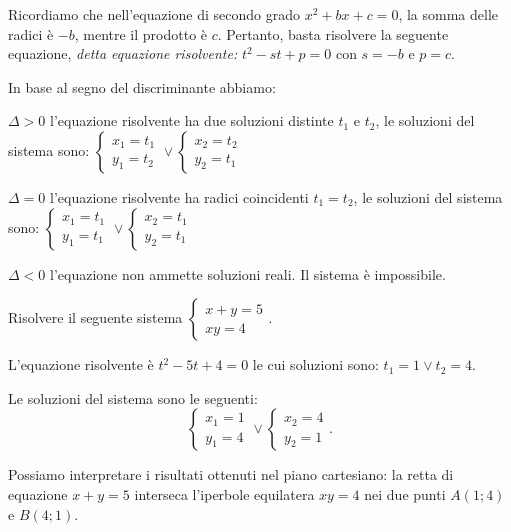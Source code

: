 Ricordiamo che nell'equazione di secondo grado \(x^2+bx+c=0\), la somma delle 
radici è \(-b\), mentre il prodotto è \(c\). Pertanto, basta risolvere la 
seguente 
equazione, \emph{detta equazione risolvente: } \(t^2-st+p=0\) con \(s=-b\) e 
\(p=c\).

In base al segno del discriminante abbiamo:
\begin{itemize*}
\item \(\Delta >0\) l'equazione risolvente ha due soluzioni distinte \( t_1 \) 
e 
\( 
t_2 \), le soluzioni del sistema sono: 
\(\left\{\begin{array}{l}{x_1=t_1}\\{y_1=t_2}\end{array}\right.\vee 
\left\{\begin{array}{l}{x_2=t_2}\\{y_2=t_1}\end{array}\right.\)
\item \(\Delta =0\) l'equazione risolvente ha radici coincidenti \(t_1=t_2\), 
le 
soluzioni del sistema sono: 
\(\left\{\begin{array}{l}{x_1=t_1}\\{y_1=t_1}\end{array}\right.\vee 
\left\{\begin{array}{l}{x_2=t_1}\\{y_2=t_1}\end{array}\right.\)
\item \(\Delta <0\) l'equazione non ammette soluzioni reali. Il sistema è 
impossibile.
\end{itemize*}

\begin{esempio}
Risolvere il seguente sistema 
\(\left\{\begin{array}{l}{x+y=5}\\{xy=4}\end{array}\right.\).
\begin{multicols}{2}
L'equazione risolvente è \(t^2-5t+4=0\) le cui soluzioni sono: \(t_1=1\vee 
t_2=4\).

Le soluzioni del sistema sono le seguenti: \[ 
\left\{\begin{array}{l}{x_1=1}\\{y_1=4}\end{array}\right.\vee 
\left\{\begin{array}{l}{x_2=4}\\{y_2=1}\end{array}\right.. \]

Possiamo interpretare i risultati ottenuti nel piano cartesiano: la retta di 
equazione \(x+y=5\) interseca l'iperbole equilatera \({xy}=4\) nei due punti 
\(A(1;4)\) e \(B(4;1)\).
\begin{center}

\end{center}
\end{multicols}
\end{esempio}


